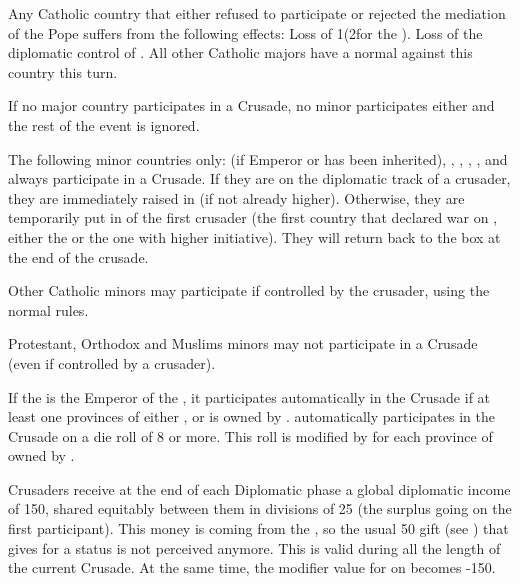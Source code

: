  Any Catholic country that either refused to
participate or rejected the mediation of the Pope suffers from the following
effects:
\bparag Loss of 1\STAB (2\STAB for the \SDCF).
\bparag Loss of the diplomatic control of \paysPapaute.
\bparag All other Catholic majors have a normal \CB against this country this
turn.

\aparag If no major country participates in a Crusade, no minor participates
either and the rest of the event is ignored.

\phdipl
{} The following minor countries only: \HAB
(if Emperor or \paysHongrie has been inherited), \paysHongrie, \paysPapaute,
\paysGenes, \paysChevaliers, \paysToscane and \paysParme always participate in
a Crusade.
\bparag If they are on the diplomatic track of a crusader, they are
immediately raised in \EW (if not already higher).
\bparag Otherwise, they are temporarily put in \EW of the first crusader (the
first country that declared war on \TUR, either the \SDCF or the one with
higher initiative). They will return back to the \Neutral box at the end of
the crusade.

\aparag Other Catholic minors may participate if controlled by the crusader,
using the normal rules.

\aparag Protestant, Orthodox and Muslims minors may not participate in a
Crusade (even if controlled by a crusader).

\bparag If the \hab is the Emperor of the \HRE, it participates automatically
in the Crusade if at least one provinces of either \paysHabsbourg, \HRE or
\paysHongrie is owned by \TUR.
\bparag \paysHongrie automatically participates in the Crusade on a die roll
of 8 or more. This roll is modified by  for each province of
\paysHongrie owned by \TUR.

Crusaders receive at the end of each Diplomatic phase a global diplomatic
income of 150\ducats, shared equitably between them in divisions of 25\ducats
(the surplus going on the first participant).
\bparag This money is coming from the \paysPapaute, so the usual 50\ducats
gift (see ) that \paysPapaute gives for a \AM
status is not perceived anymore.
\bparag This is valid during all the length of the current Crusade. At the
same time, the modifier value for \SUB on \paysPapaute becomes -150.

